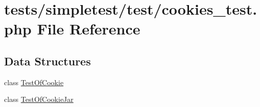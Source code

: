 \hypertarget{cookies__test_8php}{\section{tests/simpletest/test/cookies\-\_\-test.php File Reference}
\label{cookies__test_8php}
}
\subsection*{Data Structures}
\begin{DoxyCompactItemize}
\item 
class \hyperlink{class_test_of_cookie}{Test\-Of\-Cookie}
\item 
class \hyperlink{class_test_of_cookie_jar}{Test\-Of\-Cookie\-Jar}
\end{DoxyCompactItemize}
